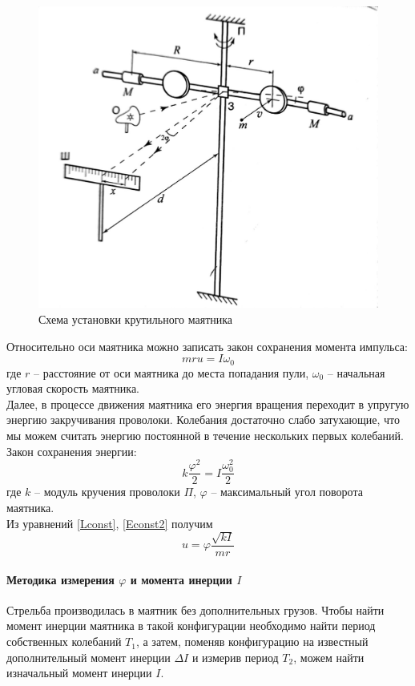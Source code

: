 \documentclass[a4paper,12pt]{article}
\begin{document}
	\begin{figure}[H]
		\centering
		\includegraphics[width=0.7\linewidth]{rot}
		\caption{Схема установки крутильного маятника}
		\label{fig:rot}
	\end{figure}
	
	Относительно оси маятника можно записать закон сохранения момента импульса:
	\begin{equation}
		\label{Lconst}
		mru=I\omega_0
	\end{equation}
	где $r$ -- расстояние от оси маятника до места попадания пули, $\omega_0$ -- начальная угловая скорость маятника.\\
	
	Далее, в процессе движения маятника его энергия вращения переходит в упругую энергию закручивания проволоки. Колебания достаточно слабо затухающие, что мы можем считать энергию постоянной в течение нескольких первых колебаний.\\
	
	Закон сохранения энергии:
	\begin{equation}
		\label{Econst2}
		k\frac{\varphi^2}{2}=I\frac{\omega_0^2}{2}
	\end{equation}
	где $k$ -- модуль кручения проволоки $\Pi$, $\varphi$ -- максимальный угол поворота маятника.\\
	
	Из уравнений \eqref{Lconst}, \eqref{Econst2} получим
	\begin{equation}
		\label{ufinal2}
		u=\varphi\frac{\sqrt{kI}}{mr}
	\end{equation}
	
	\paragraph{Методика измерения $\varphi$ и момента инерции $I$} Стрельба производилась в маятник без дополнительных грузов. Чтобы найти момент инерции маятника в такой конфигурации необходимо найти период собственных колебаний $T_1$, а затем, поменяв конфигурацию на известный дополнительный момент инерции $\Delta I$ и измерив период $T_2$, можем найти изначальный момент инерции $I$.\\
	
\end{document}
